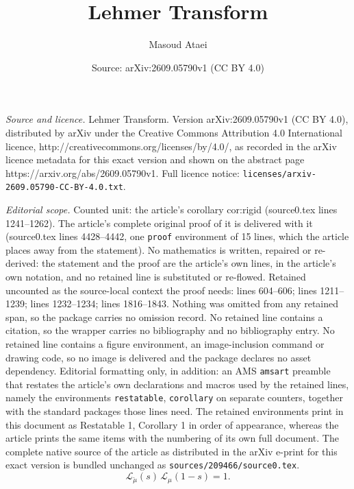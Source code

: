 \documentclass[10pt,a4paper]{amsart}
\title{Lehmer Transform}
\author{Masoud Ataei}
\date{Source: arXiv:2609.05790v1 (CC BY 4.0)}
\providecommand{\Leh}{\mathscr{L}}
\begin{document}
\maketitle

\noindent\emph{Source and licence.} Lehmer Transform. Version arXiv:2609.05790v1 (CC BY 4.0), distributed by arXiv under the Creative Commons Attribution 4.0 International licence, http://creativecommons.org/licenses/by/4.0/, as recorded in the arXiv licence metadata for this exact version and shown on the abstract page https://arxiv.org/abs/2609.05790v1. Full licence notice: \texttt{licenses/arxiv-2609.05790-CC-BY-4.0.txt}.\par\smallskip

\noindent\textit{Editorial scope.} Counted unit: the article's corollary cor:rigid (source0.tex lines 1241--1262). The article's complete original proof of it is delivered with it (source0.tex lines 4428--4442, one \texttt{proof} environment of 15 lines, which the article places away from the statement). No mathematics is written, repaired or re-derived: the statement and the proof are the article's own lines, in the article's own notation, and no retained line is substituted or re-flowed.  Retained uncounted as the source-local context the proof needs: lines 604--606; lines 1211--1239; lines 1232--1234; lines 1816--1843.  Nothing was omitted from any retained span, so the package carries no omission record.  No retained line contains a citation, so the wrapper carries no bibliography and no bibliography entry.  No retained line contains a figure environment, an image-inclusion command or drawing code, so no image is delivered and the package declares no asset dependency.  Editorial formatting only, in addition: an AMS \texttt{amsart} preamble that restates the article's own declarations and macros used by the retained lines, namely the environments \texttt{restatable}, \texttt{corollary} on separate counters, together with the standard packages those lines need.  The retained environments print in this document as Restatable 1, Corollary 1 in order of appearance, whereas the article prints the same items with the numbering of its own full document.  The complete native source of the article as distributed in the arXiv e-print for this exact version is bundled unchanged as \texttt{sources/209466/source0.tex}.
			\begin{equation}\label{eq:reflection}
				\Leh_{\check\mu}(s)\,\Leh_\mu(1-s)=1 .
			\end{equation}
\end{document}
